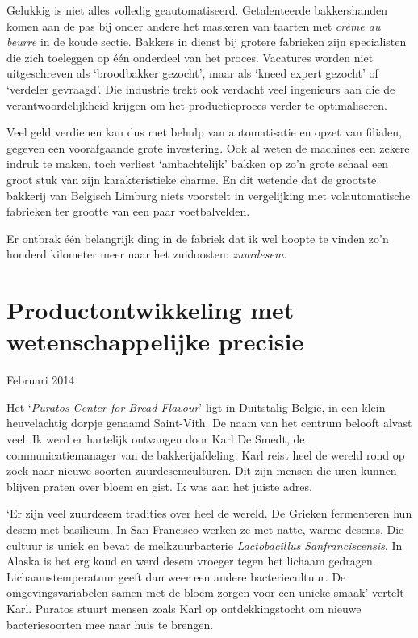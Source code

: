 \documentclass[
  11pt,
  dutch,
]{memoir}
\begin{document}
Gelukkig is niet alles volledig geautomatiseerd. Getalenteerde
bakkershanden komen aan de pas bij onder andere het maskeren van taarten
met \emph{crème au beurre} in de koude sectie. Bakkers in dienst bij
grotere fabrieken zijn specialisten die zich toeleggen op één onderdeel
van het proces. Vacatures worden niet uitgeschreven als `broodbakker
gezocht', maar als `kneed expert gezocht' of `verdeler gevraagd'. Die
industrie trekt ook verdacht veel ingenieurs aan die de
verantwoordelijkheid krijgen om het productieproces verder te
optimaliseren.

Veel geld verdienen kan dus met behulp van automatisatie en opzet van
filialen, gegeven een voorafgaande grote investering. Ook al weten de
machines een zekere indruk te maken, toch verliest `ambachtelijk' bakken
op zo'n grote schaal een groot stuk van zijn karakteristieke charme. En
dit wetende dat de grootste bakkerij van Belgisch Limburg niets
voorstelt in vergelijking met volautomatische fabrieken ter grootte van
een paar voetbalvelden.

Er ontbrak één belangrijk ding in de fabriek dat ik wel hoopte te vinden
zo'n honderd kilometer meer naar het zuidoosten: \emph{zuurdesem}.

\hypertarget{productontwikkeling-met-wetenschappelijke-precisie}{%
\section{Productontwikkeling met wetenschappelijke
precisie}\label{productontwikkeling-met-wetenschappelijke-precisie}}

\begin{flushright}
Februari 2014
\end{flushright}

Het `\emph{Puratos Center for Bread Flavour}' ligt in Duitstalig België,
in een klein heuvelachtig dorpje genaamd Saint-Vith. De naam van het
centrum belooft alvast veel. Ik werd er hartelijk ontvangen door Karl De
Smedt, de communicatiemanager van de bakkerijafdeling. Karl reist heel
de wereld rond op zoek naar nieuwe soorten zuurdesemculturen. Dit zijn
mensen die uren kunnen blijven praten over bloem en gist. Ik was aan het
juiste adres.

`Er zijn veel zuurdesem tradities over heel de wereld. De Grieken
fermenteren hun desem met basilicum. In San Francisco werken ze met
natte, warme desems. Die cultuur is uniek en bevat de melkzuurbacterie
\emph{Lactobacillus Sanfranciscensis}. In Alaska is het erg koud en werd
desem vroeger tegen het lichaam gedragen. Lichaamstemperatuur geeft dan
weer een andere bacteriecultuur. De omgevingsvariabelen samen met de
bloem zorgen voor een unieke smaak' vertelt Karl. Puratos stuurt mensen
zoals Karl op ontdekkingstocht om nieuwe bacteriesoorten mee naar huis
te brengen.
\end{document}
